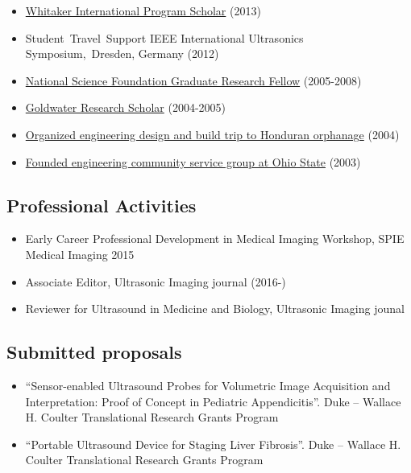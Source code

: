 \documentclass[]{article}
\begin{document}
\begin{itemize}
\itemsep1pt\parskip0pt
\item
  \href{http://www.whitaker.org/grants/fellows-scholars}{Whitaker
  International Program Scholar} (2013)
\item
  Student~Travel~Support IEEE International Ultrasonics
  Symposium,~Dresden, Germany (2012)
\item
  \href{http://www.nsfgrfp.org/}{National Science Foundation Graduate
  Research Fellow} (2005-2008)
\item
  \href{https://goldwater.scholarsapply.org/}{Goldwater Research
  Scholar} (2004-2005)
\item
  \href{http://www.montanadeluz.org/}{Organized engineering design and
  build trip to Honduran orphanage} (2004)
\item
  \href{http://ecos.osu.edu/}{Founded engineering community service
  group at Ohio State} (2003)
\end{itemize}

\subsection{Professional Activities}\label{professional-activities}

\begin{itemize}
\itemsep1pt\parskip0pt
\item
  Early Career Professional Development in Medical Imaging Workshop,
  SPIE Medical Imaging 2015
\item
  Associate Editor, Ultrasonic Imaging journal (2016-)
\item
  Reviewer for Ultrasound in Medicine and Biology, Ultrasonic Imaging
  jounal
\end{itemize}

\subsection{Submitted proposals}\label{submitted-proposals}

\begin{itemize}
\itemsep1pt\parskip0pt
\item
  ``Sensor-enabled Ultrasound Probes for Volumetric Image Acquisition
  and Interpretation: Proof of Concept in Pediatric Appendicitis''. Duke
  -- Wallace H. Coulter Translational Research Grants Program
\item
  ``Portable Ultrasound Device for Staging Liver Fibrosis''. Duke --
  Wallace H. Coulter Translational Research Grants Program
\end{itemize}
\end{document}
